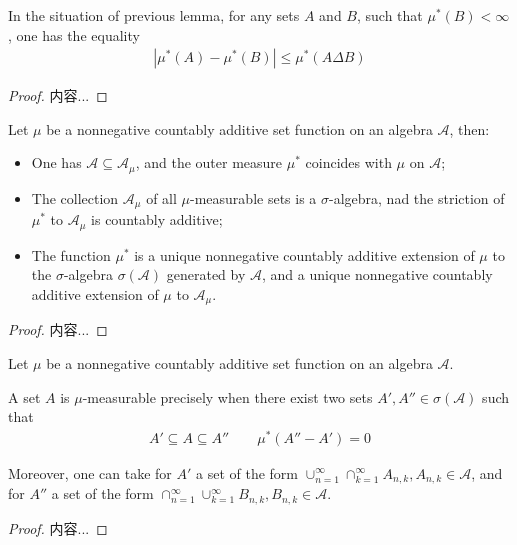 \documentclass[Total.tex]{subfiles}
\begin{document}
				\begin{lemma}
					In the situation of previous lemma, for any sets $A$ and $B$, such that $\mu^*(B)<\infty$, one has the equality
					\begin{gather*}
						|\mu^*(A)-\mu^*(B)|\leq \mu^*(A\Delta B)
					\end{gather*}
				\end{lemma}
				\begin{proof}
					内容...
				\end{proof}
				
				\begin{proposition}
					Let $\mu$ be a nonnegative countably additive set function on an algebra $\mathcal{A}$, then:
					\begin{itemize}
						\item One has $\mathcal{A}\subseteq \mathcal{A}_\mu$, and the outer measure $\mu^*$ coincides with $\mu$ on $\mathcal{A}$;
						\item The collection $\mathcal{A}_\mu$ of all $\mu$-measurable sets is a $\sigma$-algebra, nad the striction of $\mu^*$ to $\mathcal{A}_\mu$ is countably additive;
						\item The function $\mu^*$ is a unique nonnegative countably additive extension of $\mu$ to the $\sigma$-algebra $\sigma(\mathcal{A})$ generated by $\mathcal{A}$, and a unique nonnegative countably additive extension of $\mu$ to $\mathcal{A}_\mu$. 
					\end{itemize}
				\end{proposition}
				\begin{proof}
					内容...
				\end{proof}
				
				\begin{corollary}
					Let $\mu$ be a nonnegative countably additive set function on an algebra $\mathcal{A}$.
					
					A set $A$ is $\mu$-measurable precisely when there exist two sets $A',A''\in \sigma(\mathcal{A})$ such that
					\begin{gather*}
						A'\subseteq A\subseteq A''\qquad \mu^*(A''-A')=0
					\end{gather*}
					
					Moreover, one can take for $A'$ a set of the form $\cup_{n=1}^\infty \cap_{k=1}^\infty A_{n,k},A_{n,k}\in\mathcal{A}$, and for $A''$ a set of the form $\cap_{n=1}^\infty\cup_{k=1}^\infty B_{n,k},B_{n,k}\in \mathcal{A}$. 
				\end{corollary}
				\begin{proof}
					内容...
				\end{proof}
				
\end{document}

